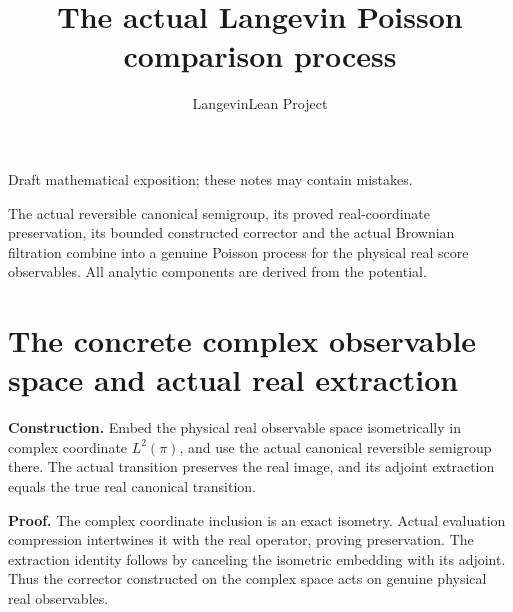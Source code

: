 \documentclass[11pt,a4paper]{article}
\title{\texorpdfstring{The actual Langevin Poisson comparison process}{The actual Langevin Poisson comparison process}}
\author{LangevinLean Project}
\date{}
\begin{document}
\maketitle
Draft mathematical exposition; these notes may contain mistakes.


The actual reversible canonical semigroup, its proved real-coordinate preservation, its bounded constructed corrector and the actual Brownian filtration combine into a genuine Poisson process for the physical real score observables. All analytic components are derived from the potential.


\section{\texorpdfstring{The concrete complex observable space and actual real extraction}{The concrete complex observable space and actual real extraction}}


\textbf{Construction.} Embed the physical real observable space isometrically in complex coordinate \(L^2(\pi)\), and use the actual canonical reversible semigroup there. The actual transition preserves the real image, and its adjoint extraction equals the true real canonical transition.



\textbf{Proof.} The complex coordinate inclusion is an exact isometry. Actual evaluation compression intertwines it with the real operator, proving preservation. The extraction identity follows by canceling the isometric embedding with its adjoint. Thus the corrector constructed on the complex space acts on genuine physical real observables.
\end{document}
